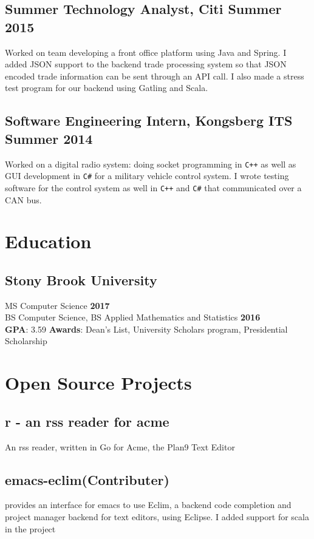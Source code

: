 \documentclass[5pt]{resume}
\begin{document}
\subsection{\textbf{Summer Technology Analyst, Citi \hfill Summer 2015}} 
{\color{default} Worked on team developing a front office
  platform using Java and Spring. I added JSON support to the backend trade
  processing system so that JSON encoded trade information can be sent through
  an API call. I also made a stress test program for our backend using Gatling
  and Scala.}

\subsection{\textbf{Software Engineering Intern, Kongsberg ITS \hfill Summer 2014}}
{\color{default} Worked on a digital radio system: doing socket programming in
  \verb!C++! as well as GUI development in \verb!C#! for a military vehicle control system. I
  wrote testing software for the control system as well in \verb!C++! and \verb!C#! that
  communicated over a CAN bus.  }


{\color{titleColor}\section{Education}}
\subsection{\textbf{Stony Brook University }}
{\color{default}MS Computer Science} \hfill \textbf{2017}\\
{\color{default}BS Computer Science, BS Applied Mathematics and Statistics} \hfill \textbf{2016} \\ 
\textbf{GPA}: {\color{default} 3.59} 
\textbf{Awards}: {\color{default}Dean’s List, University Scholars program, Presidential Scholarship}

{\color{titleColor}\section{Open Source Projects}}
\subsection{\textbf{r - an rss reader for acme}}
{\color{default} An rss reader, written in Go for Acme, the Plan9 Text Editor} 

\subsection{\textbf{emacs-eclim}\hfill (Contributer)}
{\color{default} 
  provides an interface for emacs to use Eclim, a backend code completion
 and project manager backend for text editors, using Eclipse. I added support for scala in the project }
\end{document}
